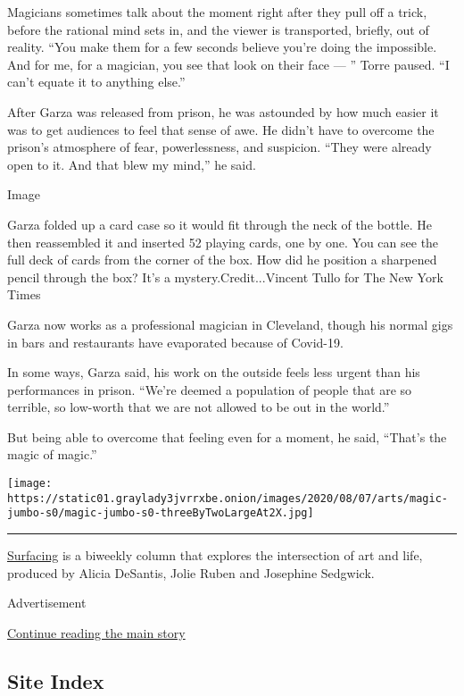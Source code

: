 Magicians sometimes talk about the moment right after they pull off a
trick, before the rational mind sets in, and the viewer is transported,
briefly, out of reality. ``You make them for a few seconds believe
you're doing the impossible. And for me, for a magician, you see that
look on their face --- '' Torre paused. ``I can't equate it to anything
else.''

After Garza was released from prison, he was astounded by how much
easier it was to get audiences to feel that sense of awe. He didn't have
to overcome the prison's atmosphere of fear, powerlessness, and
suspicion. ``They were already open to it. And that blew my mind,'' he
said.

Image

Garza folded up a card case so it would fit through the neck of the
bottle. He then reassembled it and inserted 52 playing cards, one by
one. You can see the full deck of cards from the corner of the box. How
did he position a sharpened pencil through the box? It's a
mystery.Credit...Vincent Tullo for The New York Times

Garza now works as a professional magician in Cleveland, though his
normal gigs in bars and restaurants have evaporated because of Covid-19.

In some ways, Garza said, his work on the outside feels less urgent than
his performances in prison. ``We're deemed a population of people that
are so terrible, so low-worth that we are not allowed to be out in the
world.''

But being able to overcome that feeling even for a moment, he said,
``That's the magic of magic.''

\texttt{[image: https://static01.graylady3jvrrxbe.onion/images/2020/08/07/arts/magic-jumbo-s0/magic-jumbo-s0-threeByTwoLargeAt2X.jpg]}

\begin{center}\rule{0.5\linewidth}{\linethickness}\end{center}

\href{https://www.nytimes3xbfgragh.onion/series/surfacing}{Surfacing} is
a biweekly column that explores the intersection of art and life,
produced by Alicia DeSantis, Jolie Ruben and Josephine Sedgwick.

Advertisement

\protect\hyperlink{after-bottom}{Continue reading the main story}

\hypertarget{site-index}{%
\subsection{Site Index}\label{site-index}}

